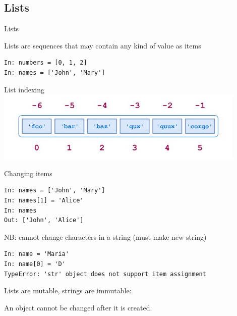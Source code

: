 \documentclass[aspectratio=169,usenames,dvipsnames]{beamer}
\begin{document}
\subsection{Lists}
\begin{frame}[fragile]{Lists}
    \begin{definition}
    Lists are sequences that may contain any kind of value as items
    \end{definition}
\begin{lstlisting} 
In: numbers = [0, 1, 2]
In: names = ['John', 'Mary']
\end{lstlisting} 
\end{frame}

\begin{frame}[fragile]{List indexing}
\includegraphics[width=0.9\textwidth]{fig/list}
\end{frame}

\begin{frame}[fragile]{Changing items}
\begin{lstlisting} 
In: names = ['John', 'Mary']
In: names[1] = 'Alice'
In: names
Out: ['John', 'Alice']
\end{lstlisting} 

\pause
NB: cannot change characters in a string (must make new string)
\begin{lstlisting} 
In: name = 'Maria'
In: name[0] = 'D'
TypeError: 'str' object does not support item assignment
\end{lstlisting}

Lists are mutable, strings are immutable:
\begin{definition}
An  object cannot be changed after it is created.
\end{definition}
\end{frame}
\end{document}
